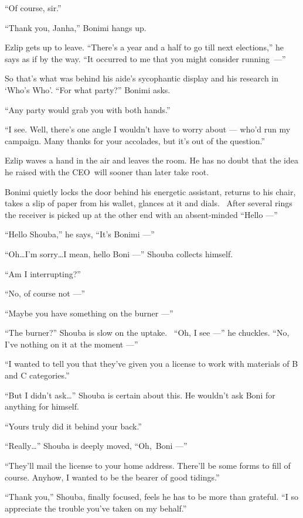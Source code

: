 \documentclass[twoside,11pt]{book}
\begin{document}
``Of course, sir.''

``Thank you, Janha,'' Bonimi hangs up.

Ezlip gets up to leave. ``There's a year and a half to go till next elections,'' he says as if
by the way. ``It occurred to me that you might consider \hbox{running ---''}

So that's what was behind his aide's sycophantic display{ }and his research in  `Who's Who'.
``For what party?'' Bonimi asks.

``Any party would grab you with both hands.''

``I see. Well, there's one angle I wouldn't have to worry about --- who'd run my campaign. Many thanks for
your accolades, but it's out of the question.''

Ezlip waves a hand in the air and leaves the room. He has no doubt that the idea he raised with the CEO~will sooner than
later take root{. }

Bonimi quietly locks the door behind his energetic assistant, returns to his chair, takes a slip of paper from his
wallet, glances at it and dials.~ After several rings the receiver is picked up at the other end with an absent-minded
``Hello ---''

``Hello Shouba,'' he says, ``It's Bonimi ---''

``Oh{\ldots}I'm sorry{\ldots}I mean, hello Boni ---'' Shouba collects himself.

``Am I interrupting?''

``No, of course not ---''

``Maybe you have something on the burner ---''

``The burner?'' Shouba is slow on the uptake. ~``Oh, I see ---'' he
chuckles. ``No, I've nothing on it at the moment ---''

``I wanted to tell you that they've given you a license to work with materials of B and C
categories.''

``But I didn't ask{\ldots}'' Shouba is certain about this. He wouldn't ask Boni for anything
for himself.

``Yours truly did it behind your back.''

``Really{\ldots}'' Shouba is deeply moved, ``Oh,~Boni ---''

``They'll mail the license to your home address. There'll be some forms to fill of course. Anyhow, I wanted
to be the bearer of good tidings.''

``Thank you,'' Shouba, finally focused, feels he has to be more than grateful.
``I so appreciate the trouble you've taken on my behalf.''
\end{document}
